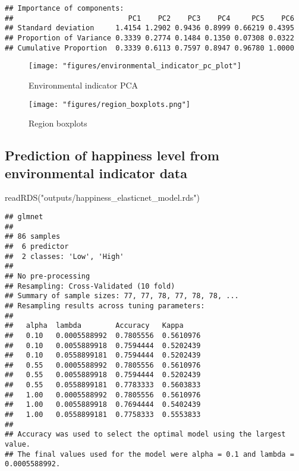 \documentclass[
]{article}
\newenvironment{Shaded}{\begin{snugshade}}{\end{snugshade}}
\newcommand{\FunctionTok}[1]{\textcolor[rgb]{0.00,0.00,0.00}{#1}}
\newcommand{\NormalTok}[1]{#1}
\newcommand{\StringTok}[1]{\textcolor[rgb]{0.31,0.60,0.02}{#1}}
\begin{document}
\begin{verbatim}
## Importance of components:
##                           PC1    PC2    PC3    PC4     PC5    PC6
## Standard deviation     1.4154 1.2902 0.9436 0.8999 0.66219 0.4395
## Proportion of Variance 0.3339 0.2774 0.1484 0.1350 0.07308 0.0322
## Cumulative Proportion  0.3339 0.6113 0.7597 0.8947 0.96780 1.0000
\end{verbatim}

\begin{figure}
\centering
\texttt{[image: "figures/environmental\_indicator\_pc\_plot"]}
\caption{Environmental indicator PCA}
\end{figure}

\begin{figure}
\centering
\texttt{[image: "figures/region\_boxplots.png"]}
\caption{Region boxplots}
\end{figure}

\hypertarget{prediction-of-happiness-level-from-environmental-indicator-data}{%
\subsection{Prediction of happiness level from environmental indicator
data}\label{prediction-of-happiness-level-from-environmental-indicator-data}}

\begin{Shaded}
\begin{Highlighting}[]
\FunctionTok{readRDS}\NormalTok{(}\StringTok{"outputs/happiness\_elasticnet\_model.rds"}\NormalTok{)}
\end{Highlighting}
\end{Shaded}

\begin{verbatim}
## glmnet 
## 
## 86 samples
##  6 predictor
##  2 classes: 'Low', 'High' 
## 
## No pre-processing
## Resampling: Cross-Validated (10 fold) 
## Summary of sample sizes: 77, 77, 78, 77, 78, 78, ... 
## Resampling results across tuning parameters:
## 
##   alpha  lambda        Accuracy   Kappa    
##   0.10   0.0005588992  0.7805556  0.5610976
##   0.10   0.0055889918  0.7594444  0.5202439
##   0.10   0.0558899181  0.7594444  0.5202439
##   0.55   0.0005588992  0.7805556  0.5610976
##   0.55   0.0055889918  0.7594444  0.5202439
##   0.55   0.0558899181  0.7783333  0.5603833
##   1.00   0.0005588992  0.7805556  0.5610976
##   1.00   0.0055889918  0.7694444  0.5402439
##   1.00   0.0558899181  0.7758333  0.5553833
## 
## Accuracy was used to select the optimal model using the largest value.
## The final values used for the model were alpha = 0.1 and lambda = 0.0005588992.
\end{verbatim}
\end{document}
